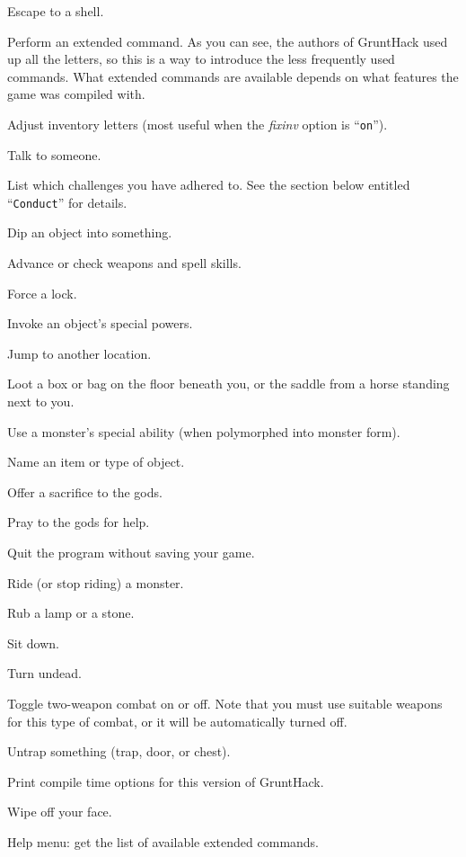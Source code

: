 Escape to a shell.
\item[\tb{\#}]
Perform an extended command.  As you can see, the authors of GruntHack
used up all the letters, so this is a way to introduce the less frequently
used commands.
What extended commands are available depends on what features the game was
compiled with.
\item[\tb{\#adjust}]
Adjust inventory letters (most useful when the
{\it fixinv }
option is ``{\tt on}'').
\item[\tb{\#chat}]
Talk to someone.
\item[\tb{\#conduct}]
List which challenges you have adhered to.  See the section below entitled
``{\tt Conduct}'' for details.
\item[\tb{\#dip}]
Dip an object into something.
\item[\tb{\#enhance}]
Advance or check weapons and spell skills.
\item[\tb{\#force}]
Force a lock.
\item[\tb{\#invoke}]
Invoke an object's special powers.
\item[\tb{\#jump}]
Jump to another location.
\item[\tb{\#loot}]
Loot a box or bag on the floor beneath you, or the saddle 
from a horse standing next to you.
\item[\tb{\#monster}]
Use a monster's special ability (when polymorphed into monster form).
\item[\tb{\#name}]
Name an item or type of object.
\item[\tb{\#offer}]
Offer a sacrifice to the gods.
\item[\tb{\#pray}]
Pray to the gods for help.
\item[\tb{\#quit}]
Quit the program without saving your game.
\item[\tb{\#ride}]
Ride (or stop riding) a monster.
\item[\tb{\#rub}]
Rub a lamp or a stone.
\item[\tb{\#sit}]
Sit down.
\item[\tb{\#turn}]
Turn undead.
\item[\tb{\#twoweapon}]
Toggle two-weapon combat on or off.  Note that you must
use suitable weapons for this type of combat, or it will
be automatically turned off.
\item[\tb{\#untrap}]
Untrap something (trap, door, or chest).
\item[\tb{\#version}]
Print compile time options for this version of GruntHack.
\item[\tb{\#wipe}]
Wipe off your face.
\item[\tb{\#?}]
Help menu:  get the list of available extended commands.

